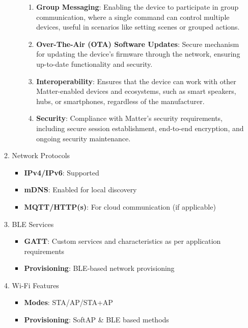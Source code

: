 \documentclass[conference]{IEEEtran}
\begin{document}
\begin{enumerate}[label=\arabic*.]
\begin{enumerate}[label=\alph*.]
\begin{itemize}
\begin{enumerate}[label=\roman*.]
\item \textbf{Group Messaging}: Enabling the device to participate in group communication, where a single command can control multiple devices, useful in scenarios like setting scenes or grouped actions.\\
\item \textbf{Over-The-Air (OTA) Software Updates}: Secure mechanism for updating the device's firmware through the network, ensuring up-to-date functionality and security.\\
\item \textbf{Interoperability}: Ensures that the device can work with other Matter-enabled devices and ecosystems, such as smart speakers, hubs, or smartphones, regardless of the manufacturer.\\
\item \textbf{Security}: Compliance with Matter's security requirements, including secure session establishment, end-to-end encryption, and ongoing security maintenance.\\
\end{enumerate}
\end{itemize}

\item Network Protocols\\
\begin{itemize}
\item \textbf{IPv4/IPv6}: Supported\\
\item \textbf{mDNS}: Enabled for local discovery\\
\item \textbf{MQTT/HTTP(s)}: For cloud communication (if applicable)\\
\end{itemize}

\item BLE Services\\
\begin{itemize}
\item \textbf{GATT}: Custom services and characteristics as per application requirements\\
\item \textbf{Provisioning}: BLE-based network provisioning\\
\end{itemize}

\item Wi-Fi Features\\
\begin{itemize}
\item \textbf{Modes}: STA/AP/STA+AP\\
\item \textbf{Provisioning}: SoftAP \& BLE based methods\\
\end{itemize}


\end{enumerate}
\end{enumerate}
\end{document}
